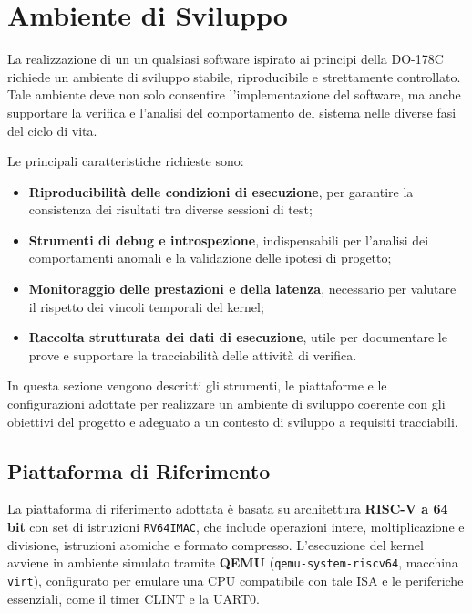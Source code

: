 \documentclass[italian, Lau, oneside]{sapthesis} %
\begin{document}
\section{Ambiente di Sviluppo}

La realizzazione di un un qualsiasi software ispirato ai principi della DO-178C richiede un ambiente di sviluppo stabile, riproducibile e strettamente controllato.  
Tale ambiente deve non solo consentire l’implementazione del software, ma anche supportare la verifica e l’analisi del comportamento del sistema nelle diverse fasi del ciclo di vita.

Le principali caratteristiche richieste sono:
\begin{itemize}
    \item \textbf{Riproducibilità delle condizioni di esecuzione}, per garantire la consistenza dei risultati tra diverse sessioni di test;
    \item \textbf{Strumenti di debug e introspezione}, indispensabili per l’analisi dei comportamenti anomali e la validazione delle ipotesi di progetto;
    \item \textbf{Monitoraggio delle prestazioni e della latenza}, necessario per valutare il rispetto dei vincoli temporali del kernel;
    \item \textbf{Raccolta strutturata dei dati di esecuzione}, utile per documentare le prove e supportare la tracciabilità delle attività di verifica.
\end{itemize}

In questa sezione vengono descritti gli strumenti, le piattaforme e le configurazioni adottate per realizzare un ambiente di sviluppo coerente con gli obiettivi del progetto e adeguato a un contesto di sviluppo a requisiti tracciabili.

\subsection{Piattaforma di Riferimento}

La piattaforma di riferimento adottata è basata su architettura \textbf{RISC-V a 64 bit} con set di istruzioni \texttt{RV64IMAC}, che include operazioni intere, moltiplicazione e divisione, istruzioni atomiche e formato compresso.  
L’esecuzione del kernel avviene in ambiente simulato tramite \textbf{QEMU} (\texttt{qemu-system-riscv64}, macchina \texttt{virt}), configurato per emulare una CPU compatibile con tale ISA e le periferiche essenziali, come il timer CLINT e la UART0.
\end{document}
